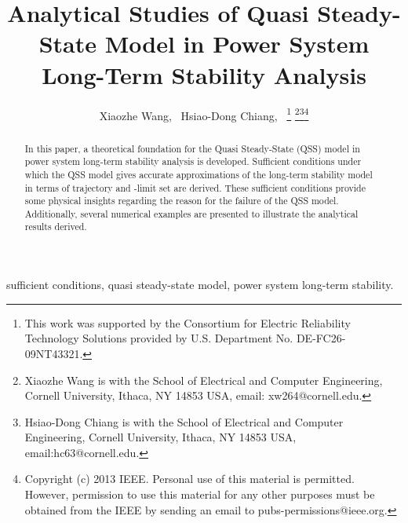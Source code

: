 \documentclass[journal]{IEEEtran}
\begin{document}
\renewcommand{\thefigure}{\arabic{figure}}
\renewcommand{\thesubfigure}{\alph{subfigure}}

\title{Analytical Studies of Quasi Steady-State Model in Power System Long-Term Stability Analysis}


\author{Xiaozhe Wang,~
        Hsiao-Dong Chiang,~
\thanks{This work was supported by the Consortium for Electric Reliability
Technology Solutions provided by U.S. Department No. DE-FC26-
09NT43321.}
\thanks{Xiaozhe Wang is with the School of Electrical and Computer Engineering, Cornell University, Ithaca,
NY 14853 USA, email: xw264@cornell.edu.}\thanks{Hsiao-Dong Chiang is with the School of Electrical and Computer Engineering, Cornell University, Ithaca, NY 14853 USA, email:hc63@cornell.edu.}\thanks{Copyright (c) 2013 IEEE. Personal use of this material is
permitted. However, permission to use this material
for any other purposes must be obtained from the IEEE by
sending an email to pubs-permissions@ieee.org.}}


\maketitle


\begin{abstract}
In this paper, a theoretical foundation for the Quasi Steady-State (QSS) model in power system long-term stability analysis is developed. Sufficient conditions under which the QSS model gives accurate approximations of the long-term stability model in terms of trajectory and -limit set are derived. These sufficient conditions provide some physical insights regarding the reason for the failure of the QSS model. Additionally, several numerical examples are presented to illustrate the analytical results derived.
\end{abstract}

\begin{IEEEkeywords}
sufficient conditions, quasi steady-state model, power system long-term stability.
\end{IEEEkeywords}

\IEEEpeerreviewmaketitle
\end{document}
